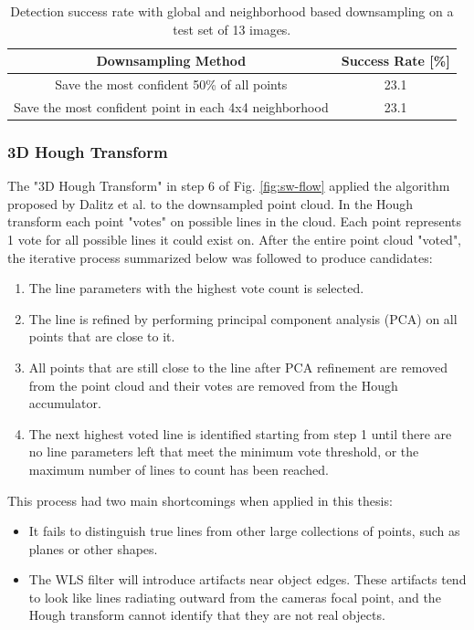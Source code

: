 \begin{table}[H]
    \centering
    \caption{Detection success rate with global and neighborhood based downsampling on a test set of 13 images.}
    \label{tab:bad-downsample}
    \begin{tabular}{|c||c|}
        \hline
        Downsampling Method &  Success Rate [\%] \\
        \hline
        Save the most confident 50\% of all points & 23.1 \\
        Save the most confident point in each 4x4 neighborhood & 23.1 \\
        \hline
    \end{tabular}
\end{table}

\subsubsection{3D Hough Transform}

The "3D Hough Transform" in step 6 of Fig. \ref{fig:sw-flow} applied the algorithm proposed by Dalitz et al. \cite{dalitz_iterative_2017} 
to the downsampled point cloud. In the Hough transform each point "votes" on possible lines in the cloud. 
Each point represents 1 vote for all possible lines it could exist on. After the entire point cloud "voted",
the iterative process summarized below was followed to produce candidates:
\begin{enumerate}
    \item The line parameters with the highest vote count is selected.
    \item The line is refined by performing principal component analysis (PCA) on all points that are close to it.
    \item All points that are still close to the line after PCA refinement are removed from the point cloud and
        their votes are removed from the Hough accumulator.
    \item The next highest voted line is identified starting from step 1 until there are no line parameters left that
        meet the minimum vote threshold, or the maximum number of lines to count has been reached.
\end{enumerate}

This process had two main shortcomings when applied in this thesis:
\begin{itemize}
    \item It fails to distinguish true lines from other large collections of points, such as planes or other shapes.
    \item The WLS filter will introduce artifacts near object edges. These artifacts tend to look like lines radiating outward from the
        cameras focal point, and the Hough transform cannot identify that they are not real objects.
\end{itemize}


